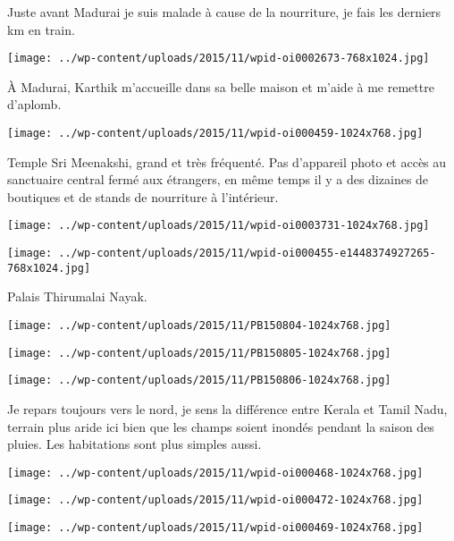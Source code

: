 \pagebreak
 Juste avant Madurai je suis malade à cause de la nourriture, je fais les derniers km en train. 
\begin{center} \texttt{[image: ../wp-content/uploads/2015/11/wpid-oi0002673-768x1024.jpg]} \end{center}

 À Madurai, Karthik m'accueille dans sa belle maison et m'aide à me remettre d'aplomb. 
\begin{center} \texttt{[image: ../wp-content/uploads/2015/11/wpid-oi000459-1024x768.jpg]} \end{center}

 Temple Sri Meenakshi, grand et très fréquenté. Pas d'appareil photo et accès au sanctuaire central fermé aux étrangers, en même temps il y a des dizaines de boutiques et de stands de nourriture à l'intérieur. 
\begin{center} \texttt{[image: ../wp-content/uploads/2015/11/wpid-oi0003731-1024x768.jpg]} \end{center}
\begin{center} \texttt{[image: ../wp-content/uploads/2015/11/wpid-oi000455-e1448374927265-768x1024.jpg]} \end{center}

  Palais Thirumalai Nayak. 
\begin{center} \texttt{[image: ../wp-content/uploads/2015/11/PB150804-1024x768.jpg]} \end{center}
\begin{center} \texttt{[image: ../wp-content/uploads/2015/11/PB150805-1024x768.jpg]} \end{center}
\begin{center} \texttt{[image: ../wp-content/uploads/2015/11/PB150806-1024x768.jpg]} \end{center}

 Je repars toujours vers le nord, je sens la différence entre Kerala et Tamil Nadu, terrain plus aride ici bien que les champs soient inondés pendant la saison des pluies. Les habitations sont plus simples aussi. 
\begin{center} \texttt{[image: ../wp-content/uploads/2015/11/wpid-oi000468-1024x768.jpg]} \end{center}
\begin{center} \texttt{[image: ../wp-content/uploads/2015/11/wpid-oi000472-1024x768.jpg]} \end{center}
\begin{center} \texttt{[image: ../wp-content/uploads/2015/11/wpid-oi000469-1024x768.jpg]} \end{center}

